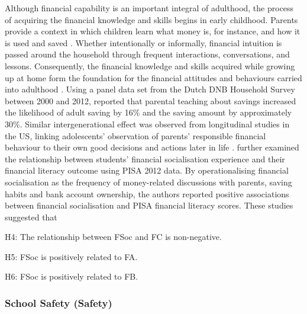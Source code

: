 Although financial capability is an important integral of adulthood, the process of acquiring the financial knowledge and skills begins in early childhood. Parents provide a context in which children learn what money is, for instance, and how it is used and saved \parencite{birbili:2015}. Whether intentionally or informally, financial intuition is passed around the household through frequent interactions, conversations, and lessons. Consequently, the financial knowledge and skills acquired while growing up at home form the foundation for the financial attitudes and behaviours carried into adulthood \parencite{serido:2016}. Using a panel data set from the Dutch DNB Household Survey between 2000 and 2012, \textcite{bucciol:2014} reported that parental teaching about savings increased the likelihood of adult saving by 16\% and the saving amount by approximately 30\%. Similar intergenerational effect was observed from longitudinal studies in the US, linking adolescents' observation of parents' responsible financial behaviour to their own good decisions and actions later in life \parencite{tang:2017}. \textcite{morenoherrero:2018a} further examined the relationship between students' financial socialisation experience and their financial literacy outcome using PISA 2012 data. By operationalising financial socialisation as the frequency of money-related discussions with parents, saving habits and bank account ownership, the authors reported positive associations between financial socialisation and PISA financial literacy scores. These studies suggested that
\begin{MAEitemize}
    \item[H4:] The relationship between FSoc and FC is non-negative.
    \item[H5:] FSoc is positively related to FA.
    \item[H6:] FSoc is positively related to FB.
\end{MAEitemize}

\subsubsection{School Safety (Safety)}

